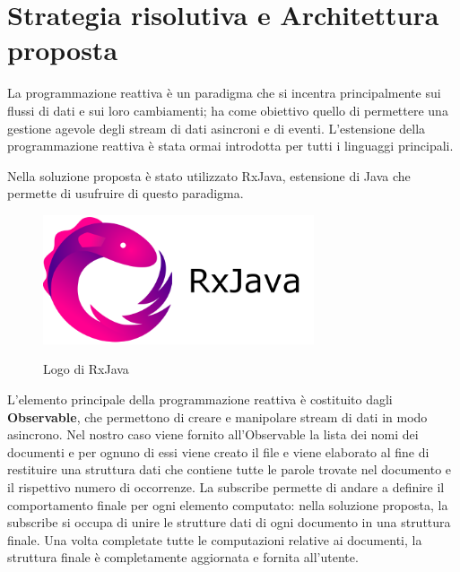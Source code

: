 \section{Strategia risolutiva e Architettura proposta}

La programmazione reattiva è un paradigma che si incentra principalmente sui flussi di dati e sui loro cambiamenti; ha come obiettivo quello di permettere una gestione agevole degli stream di dati asincroni e di eventi.\newline
L'estensione della programmazione reattiva è stata ormai introdotta per tutti i linguaggi principali.\newline

\noindent Nella soluzione proposta è stato utilizzato RxJava, estensione di Java che permette di usufruire di questo paradigma.\newline

\begin{figure}[H]
    \caption{Logo di RxJava}
    \centering
    \includegraphics[width=80mm]{img/rx_logo.png}
    \label{fig:rx_logo}
\end{figure}

\noindent L'elemento principale della programmazione reattiva è costituito dagli \textbf{Observable}, che permettono di creare e manipolare stream di dati in modo asincrono.\newline
Nel nostro caso viene fornito all'Observable la lista dei nomi dei documenti e per ognuno di essi viene creato il file e viene elaborato al fine di restituire una struttura dati che contiene tutte le parole trovate nel documento e il rispettivo numero di occorrenze.\newline
La subscribe permette di andare a definire il comportamento finale per ogni elemento computato: nella soluzione proposta, la subscribe si occupa di unire le strutture dati di ogni documento in una struttura finale. Una volta completate tutte le computazioni relative ai documenti, la struttura finale è completamente aggiornata e fornita all'utente.
